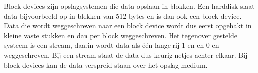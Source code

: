 Block devices zijn opslagsystemen die data opslaan in blokken. Een harddisk slaat data bijvoorbeeld op in blokken van 512-bytes en is dan ook een block device. Data die wordt weggeschreven naar een block device wordt dus eerst opgehakt in kleine vaste stukken en dan per block weggeschreven. Het tegenover gestelde systeem is een stream, daarin wordt data als \'e\'en lange rij 1-en en 0-en weggeschreven. Bij een stream staat de data dus keurig netjes achter elkaar. Bij block devices kan de data verspreid staan over het opslag medium.
